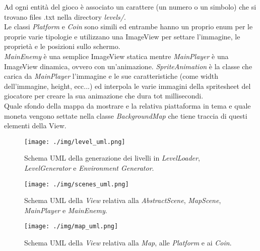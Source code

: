 \textsf{\small Ad ogni entità del gioco è associato un carattere (un numero o un simbolo) che si trovano files .txt nella directory \emph{levels/}.}\\ %

\textsf{\small Le classi \emph{Platform} e \emph{Coin} sono simili ed entrambe hanno un proprio enum per le proprie varie tipologie e utilizzano una ImageView per settare l'immagine, le proprietà e le posizioni sullo schermo.}\\

\textsf{\small \emph{MainEnemy} è una semplice ImageView statica mentre \emph{MainPlayer} è una ImageView dinamica, ovvero con un'animazione.}
\textsf{\small \emph{SpriteAnimation} è la classe che carica da \emph{MainPlayer} l'immagine e le sue caratteristiche (come width dell'immagine, height, ecc...) ed interpola le varie immagini della spritesheet del giocatore per creare la sua animazione che dura tot millisecondi.}\\

\textsf{\small  Quale sfondo della mappa da mostrare e la relativa piattaforma in tema e quale moneta vengono settate nella classe \emph{BackgroundMap} che tiene traccia di questi elementi della View.}\\

\begin{figure}[H]
	\centering{} 
	\texttt{[image: ./img/level\_uml.png]} 
	\caption{Schema UML della generazione dei livelli in \emph{LevelLoader}, \emph{LevelGenerator} e \emph{Environment Generator}.}
	\label{img:level_uml}
\end{figure}

\begin{figure}[H]
	\centering{} %
	\texttt{[image: ./img/scenes\_uml.png]} 
	\caption{Schema UML della \emph{View} relativa alla \emph{AbstractScene}, \emph{MapScene}, \emph{MainPlayer} e \emph{MainEnemy}.}
	\label{img:scenes_uml}
\end{figure}

\begin{figure}[H]
	\centering{}
	\texttt{[image: ./img/map\_uml.png]} 
	\caption{Schema UML della \emph{View} relativa alla \emph{Map}, alle \emph{Platform} e ai \emph{Coin}.}
	\label{img:map_uml}
\end{figure}


